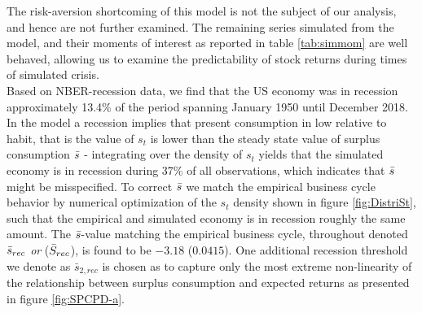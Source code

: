 


The risk-aversion shortcoming of this model is not the subject of our analysis, and hence are not further examined. The remaining series simulated from the model, and their moments of interest as reported in table \ref{tab:simmom} are well behaved, allowing us to examine the predictability of stock returns during times of simulated crisis.
\newline
\\
Based on NBER-recession data, we find that the US economy was in recession approximately 13.4\% of the period spanning January 1950 until December 2018.  In the model a recession implies that present consumption in low relative to habit, that is the value of $s_t$ is lower than the steady state value of surplus consumption $\Bar{s}$ - integrating over the density of $s_t$ yields that the simulated economy is in recession during 37\% of all observations, which indicates that $\Bar{s}$ might be misspecified. To correct $\Bar{s}$ we match the empirical business cycle behavior by numerical optimization of the $s_t$ density shown in figure \ref{fig:DistriSt}, such that the empirical and simulated economy is in recession roughly the same amount. The $\Bar{s}$-value matching the empirical business cycle, throughout denoted $\Bar{s}_{rec}$ \textit{or} ($\Bar{S}_{rec}$), is found to be $-3.18$ ($0.0415$). One additional recession threshold we denote as $\bar{s}_{2,rec}$ is chosen as to capture only the most extreme non-linearity of the relationship between surplus consumption and expected returns as presented in figure \ref{fig:SPCPD-a}.





